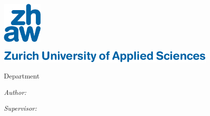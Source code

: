 

\begin{titlepage}

\setlength{\parskip}{0pt}

\begin{center}
\includegraphics[width=0.15\textwidth]{Figures/zhaw_rgb}

\ifxetex
    \vspace{0.6cm}
    {\zhawtitlefont\color{zhawblue}\LARGE \univname\par}   %
    \vspace{0.2cm}
\else
    \vspace{0.87cm}
    {\includegraphics[height=17.9pt]{Figures/zhaw_font_eng_font}\par}
    \vspace{0.05cm}
\fi
{\Large Department \deptname\par}                      %
\vspace{0.2cm}
{\Large \instname\par}                                 %
\vspace{3.5cm}                            
\textsc{\Large \ttype}                                 %
\vspace{0.2cm}
\HRule 
\vspace{0.4cm}
{\huge \bfseries \ttitle\par}                          %
\vspace{0.4cm}  
\HRule
\vspace{1.5cm}

 
\begin{minipage}[t]{0.4\textwidth}
\begin{flushleft} 
    \large
    \emph{Author:}\\
    \authorname
\end{flushleft}
\end{minipage}
\begin{minipage}[t]{0.4\textwidth}
\begin{flushright} 
    \large
    \emph{Supervisor:}\\
    \supnameA
    \ifdefempty{\supnameB}{}{\\ \supnameB}
\end{flushright}
\end{minipage}
\vspace{2cm}
 

\end{center}
\end{titlepage}
